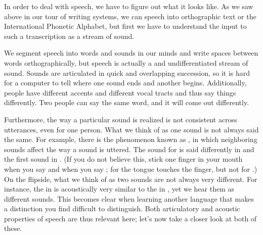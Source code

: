 In order to deal with speech, we have to figure out what it looks
like.  As we saw above in our tour of writing systems, we can  speech into orthographic text or the International Phonetic Alphabet, but first we have to understand the input to such a transcription as a stream of sound.


We segment speech into words and sounds in our minds and write spaces
between words orthographically, but speech is actually a
 and undifferentiated stream of sound. Sounds are
articulated in quick and overlapping succession, so it is hard for a
computer to tell where one sound ends and another begins.
Additionally, people have different accents and different vocal tracts
and thus say things differently.  Two people can say the same word,
and it will come out differently.

Furthermore, the way a particular sound is realized is not consistent
across utterances, even for one person.  What we think of as one sound
is not always said the same.  For example, there is the phenomenon
known as , in which neighboring sounds affect
the way a sound is uttered.  
The sound for  is said
differently in  and the first sound in .  (If you do not believe
this, stick one finger in your mouth when you say  and
when you say ; for  the tongue touches the finger, but not for .) 
On the flipside, what we think of as two sounds are not always very
different.  For instance, the  in  is
acoustically very similar to the  in , yet we
hear them as different sounds.  This becomes clear when learning
another language that makes a distinction you find difficult to
distinguish.
Both articulatory and acoustic properties of speech are thus relevant
here; let's now take a closer look at both of these.

